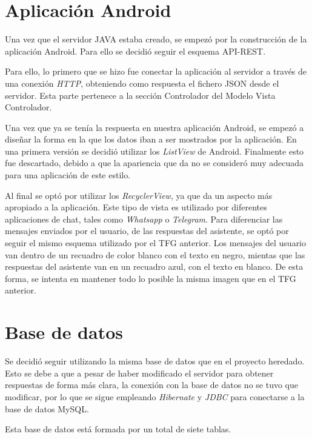 \section{Aplicación Android}

Una vez que el servidor JAVA estaba creado, se empezó por la construcción de la aplicación Android. Para ello se decidió seguir el esquema API-REST.


Para ello, lo primero que se hizo fue conectar la aplicación al servidor a través de una conexión \textit{HTTP}, obteniendo como respuesta el fichero JSON desde el servidor. Esta parte pertenece a la sección Controlador del Modelo Vista Controlador.

Una vez que ya se tenía la respuesta en nuestra aplicación Android, se empezó a diseñar la forma en la que los datos iban a ser mostrados por la aplicación. En una primera versión se decidió utilizar los \textit{ListView} de Android. Finalmente esto fue descartado, debido a que la apariencia que da no se consideró muy adecuada para una aplicación de este estilo.


Al final se optó por utilizar los \textit{RecyclerView}, ya que da un aspecto más apropiado a la aplicación. Este tipo de vista es utilizado por diferentes aplicaciones de chat, tales como \textit{Whatsapp} o \textit{Telegram}. Para diferenciar las mensajes enviados por el usuario, de las respuestas del asistente, se optó por seguir el mismo esquema utilizado por el TFG anterior. Los mensajes del usuario van dentro de un recuadro de color blanco con el texto en negro, mientas que las respuestas del asistente van en un recuadro azul, con el texto en blanco. De esta forma, se intenta en mantener todo lo posible la misma imagen que en el TFG anterior.

\section{Base de datos}

Se decidió seguir utilizando la misma base de datos que en el proyecto heredado. Esto se debe a que a pesar de haber modificado el servidor para obtener respuestas de forma más clara, la conexión con la base de datos no se tuvo que modificar, por lo que se sigue empleando \textit{Hibernate} y \textit{JDBC} para conectarse a la base de datos MySQL.

Esta base de datos está formada por un total de siete tablas.

